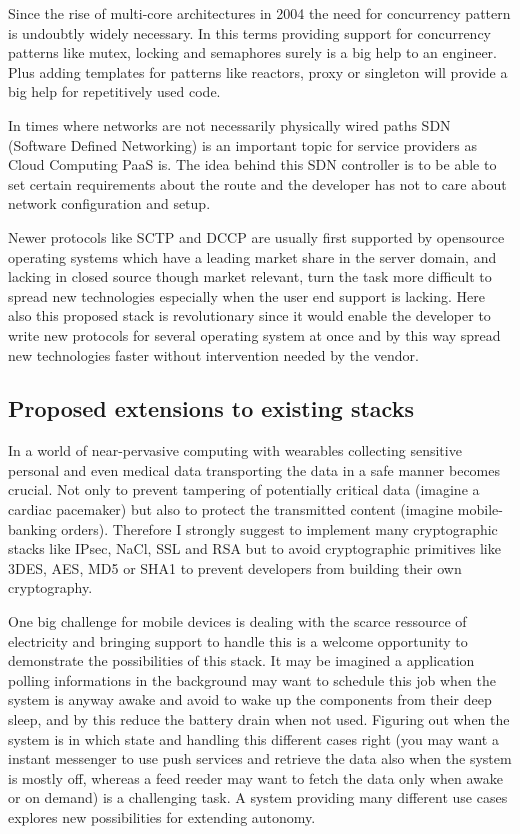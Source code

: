 \documentclass[twocolumn,english]{IEEEtran}
\theoremstyle{plain}
\theoremstyle{plain}
\begin{document}
Since the rise of multi-core architectures in
2004\cite{amd:first-multicore-x86} the need for concurrency pattern is
undoubtly widely necessary. In this terms providing support for concurrency
patterns like mutex, locking and semaphores surely is a big help to an
engineer. Plus adding templates for patterns like reactors, proxy or singleton
will provide a big help for repetitively used code.

In times where networks are not necessarily physically wired paths SDN
(Software Defined Networking) is an important topic for service providers as
Cloud Computing PaaS is. The idea behind this SDN controller is to be able to
set certain requirements about the route and the developer has not to care
about network configuration and setup.

Newer protocols like SCTP and DCCP are usually first supported by opensource
operating systems which have a leading market share in the server
domain\cite{w3techs:os-web}, and lacking in closed source though market
relevant, turn the task more difficult to spread new technologies especially
when the user end support is lacking\cite{netmarketshare:desktop-os}. Here
also this proposed stack is revolutionary since it would enable the developer
to write new protocols for several operating system at once and by this way
spread new technologies faster without intervention needed by the vendor.

\subsection{Proposed extensions to existing stacks}

In a world of near-pervasive computing with wearables collecting sensitive
personal and even medical data transporting the data in a safe manner becomes
crucial. Not only to prevent tampering of potentially critical data (imagine a
cardiac pacemaker) but also to protect the transmitted content (imagine
mobile-banking orders). Therefore I strongly suggest to implement many
cryptographic stacks like IPsec, NaCl, SSL and RSA but to avoid cryptographic
primitives like 3DES, AES, MD5 or SHA1 to prevent developers from building
their own cryptography.

One big challenge for mobile devices is dealing with the scarce ressource of
electricity and bringing support to handle this is a welcome opportunity to
demonstrate the possibilities of this stack. It may be imagined a application
polling informations in the background may want to schedule this job when the
system is anyway awake and avoid to wake up the components from their deep
sleep, and by this reduce the battery drain when not used. Figuring out when
the system is in which state and handling this different cases right (you may
want a instant messenger to use push services and retrieve the data also when
the system is mostly off, whereas a feed reeder may want to fetch the data
only when awake or on demand) is a challenging task. A system providing many
different use cases explores new possibilities for extending autonomy.
\end{document}
